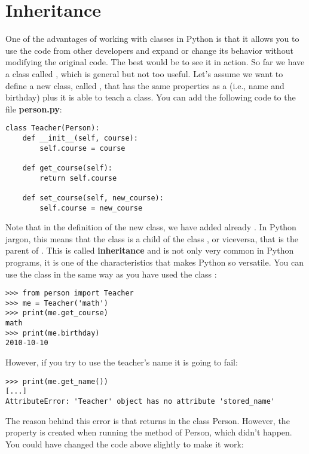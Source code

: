 \section{Inheritance}
One of the advantages of working with classes in Python is that it allows you to use the code from other developers and expand or change its behavior without modifying the original code. The best would be to see it in action. So far we have a class called , which is general but not too useful. Let's assume we want to define a new class, called , that has the same properties as a  (i.e., name and birthday) plus it is able to teach a class. You can add the following code to the file \textbf{person.py}:

\begin{verbatim}
class Teacher(Person):
    def __init__(self, course):
        self.course = course
        
    def get_course(self):
        return self.course
        
    def set_course(self, new_course):
        self.course = new_course
\end{verbatim}

Note that in the definition of the new  class, we have added already . In Python jargon, this means that the class  is a child of the class , or viceversa, that  is the parent of . This is called \textbf{inheritance} and is not only very common in Python programs, it is one of the characteristics that makes Python so versatile. You can use the class  in the same way as you have used the class :

\begin{verbatim}
>>> from person import Teacher
>>> me = Teacher('math')
>>> print(me.get_course)
math
>>> print(me.birthday)
2010-10-10
\end{verbatim}

However, if you try to use the teacher's name it is going to fail:

\begin{verbatim}
>>> print(me.get_name())
[...]
AttributeError: 'Teacher' object has no attribute 'stored_name'
\end{verbatim}

The reason behind this error is that  returns  in the class Person. However, the property  is created when running the  method of Person, which didn't happen. You could have changed the code above slightly to make it work: 

